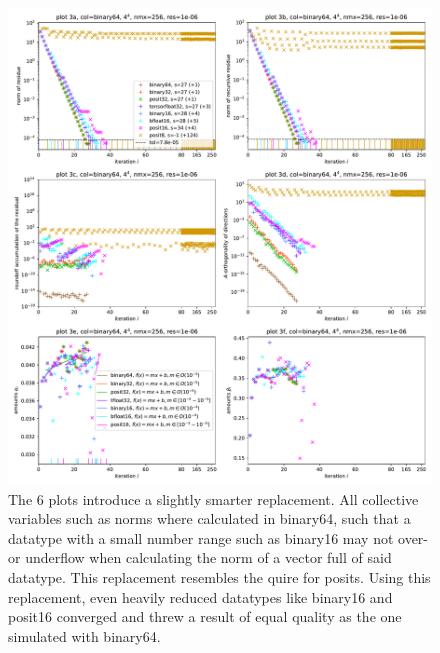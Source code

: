 \documentclass{article}
\theoremstyle{plain} %
\theoremstyle{convention} %
\theoremstyle{remark} %
\numberwithin{equation}{section}
\begin{document}
\begin{figure}
    \centering
    \includegraphics[width=1.0\textwidth]{plots/cgne_final_2}
    \caption{The 6 plots introduce a slightly smarter replacement. All collective variables such as norms where calculated in \gls{binary64}, such that a datatype with a small number range such as \gls{binary16} may not over- or underflow when calculating the norm of a vector full of said datatype. This replacement resembles the \gls{quire} for posits. Using this replacement, even heavily reduced datatypes like \gls{binary16} and \gls{posit16} converged and threw a result of equal quality as the one simulated with \gls{binary64}.}
    \label{fig:cgne:col64}
\end{figure}
\end{document}
